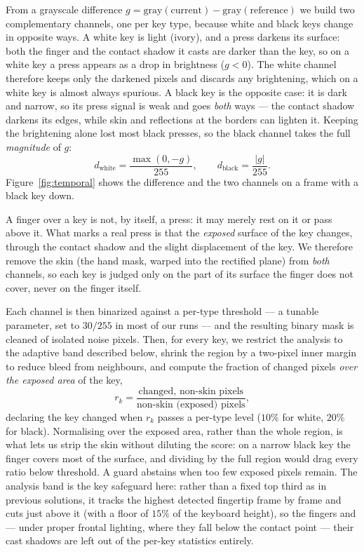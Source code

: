 \documentclass[11pt]{article}
\begin{document}
From a grayscale difference $g = \text{gray}(\text{current}) -
\text{gray}(\text{reference})$ we build two complementary channels, one per key
type, because white and black keys change in opposite ways. A white key is light
(ivory), and a press darkens its surface: both the finger and the contact shadow
it casts are darker than the key, so on a white key a press appears as a drop in
brightness ($g<0$). The white channel therefore keeps only the darkened pixels and
discards any brightening, which on a white key is almost always spurious. A black
key is the opposite case: it is dark and narrow, so its press signal is weak and
goes \emph{both} ways --- the contact shadow darkens its edges, while skin and
reflections at the borders can lighten it. Keeping the brightening alone lost most
black presses, so the black channel takes the full \emph{magnitude} of $g$:
\begin{equation}
  d_{\text{white}} = \frac{\max(0,-g)}{255}, \qquad
  d_{\text{black}} = \frac{|g|}{255}.
\end{equation}
Figure~\ref{fig:temporal} shows the difference and the two channels on a frame
with a black key down.

A finger over a key is not, by itself, a press: it may merely rest on it or pass
above it. What marks a real press is that the \emph{exposed} surface of the key
changes, through the contact shadow and the slight displacement of the key. We
therefore remove the skin (the hand mask, warped into the rectified plane) from
\emph{both} channels, so each key is judged only on the part of its surface the
finger does not cover, never on the finger itself.

Each channel is then binarized against a per-type threshold --- a tunable
parameter, set to $30/255$ in most of our runs --- and the resulting binary mask is
cleaned of isolated noise pixels.
Then, for every key, we restrict the analysis to the adaptive band described below,
shrink the region by a two-pixel inner margin to reduce bleed from neighbours, 
and compute the fraction of changed pixels \emph{over the exposed area} of the key,
\begin{equation}
  r_k = \frac{\text{changed, non-skin pixels}}{\text{non-skin (exposed) pixels}},
\end{equation}
declaring the key changed when $r_k$ passes a per-type level ($10\%$ for white,
$20\%$ for black). Normalising over the exposed area, rather than the whole
region, is what lets us strip the skin without diluting the score: on a narrow
black key the finger covers most of the surface, and dividing by the full region
would drag every ratio below threshold. A guard abstains when too few exposed
pixels remain. The analysis band is the key safeguard here: rather than a fixed
top third as in previous solutions, it tracks the highest detected fingertip frame
by frame and cuts just above it (with a floor of $15\%$ of the keyboard height),
so the fingers and --- under proper frontal lighting, where they fall below the 
contact point --- their cast shadows are left out of the per-key statistics entirely.
\end{document}
